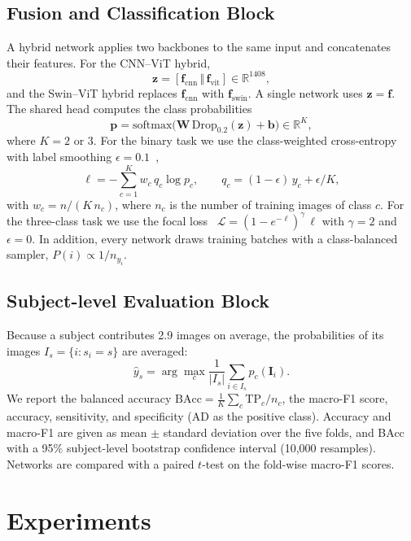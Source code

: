 \documentclass[conference,a4paper]{IEEEtran}
\newcommand{\R}{\mathbb{R}}
\begin{document}
\subsection{Fusion and Classification Block}
A hybrid network applies two backbones to the same input and concatenates their features. For the CNN--ViT hybrid,
\begin{equation}
\mathbf{z}=[\mathbf{f}_{\mathrm{cnn}}\,\Vert\,\mathbf{f}_{\mathrm{vit}}]\in\R^{1408},
\end{equation}
and the Swin--ViT hybrid replaces $\mathbf{f}_{\mathrm{cnn}}$ with $\mathbf{f}_{\mathrm{swin}}$. A single network uses $\mathbf{z}=\mathbf{f}$. The shared head computes the class probabilities
\begin{equation}
\mathbf{p}=\mathrm{softmax}\big(\mathbf{W}\,\mathrm{Drop}_{0.2}(\mathbf{z})+\mathbf{b}\big)\in\R^{K},
\end{equation}
where $K=2$ or $3$. For the binary task we use the class-weighted cross-entropy with label smoothing $\epsilon=0.1$~\cite{muller2019does},
\begin{equation}
\ell=-\sum_{c=1}^{K}w_c\,q_c\log p_c,\qquad q_c=(1-\epsilon)\,y_c+\epsilon/K,
\end{equation}
with $w_c=n/(K\,n_c)$, where $n_c$ is the number of training images of class $c$. For the three-class task we use the focal loss~\cite{lin2017focal} $\mathcal{L}=(1-e^{-\ell})^{\gamma}\,\ell$ with $\gamma=2$ and $\epsilon=0$. In addition, every network draws training batches with a class-balanced sampler, $P(i)\propto 1/n_{y_i}$.

\subsection{Subject-level Evaluation Block}
Because a subject contributes 2.9 images on average, the probabilities of its images $I_s=\{i:s_i=s\}$ are averaged:
\begin{equation}
\hat{y}_s=\arg\max_{c}\frac{1}{|I_s|}\sum_{i\in I_s}p_c(\mathbf{I}_i).
\end{equation}
We report the balanced accuracy $\mathrm{BAcc}=\frac{1}{K}\sum_{c}\mathrm{TP}_c/n_c$, the macro-F1 score, accuracy, sensitivity, and specificity (AD as the positive class). Accuracy and macro-F1 are given as mean $\pm$ standard deviation over the five folds, and BAcc with a 95\% subject-level bootstrap confidence interval (10{,}000 resamples). Networks are compared with a paired $t$-test on the fold-wise macro-F1 scores.

\section{Experiments}
\end{document}
